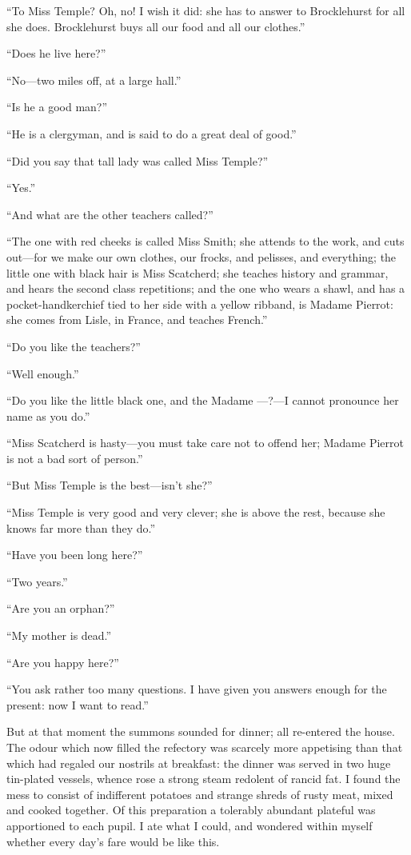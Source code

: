 \enquote{To Miss Temple? Oh, no! I wish it did: she has to answer to
	\Mr{} Brocklehurst for all she does. \Mr{} Brocklehurst buys all our food
	and all our clothes.}

\enquote{Does he live here?}

\enquote{No---two miles off, at a large hall.}

\enquote{Is he a good man?}

\enquote{He is a clergyman, and is said to do a great deal of good.}

\enquote{Did you say that tall lady was called Miss Temple?}

\enquote{Yes.}

\enquote{And what are the other teachers called?}

\enquote{The one with red cheeks is called Miss Smith; she attends to
	the work, and cuts out---for we make our own clothes, our frocks, and
	pelisses, and everything; the little one with black hair is Miss
	Scatcherd; she teaches history and grammar, and hears the second class
	repetitions; and the one who wears a shawl, and has a
	pocket-handkerchief tied to her side with a yellow ribband, is Madame
	Pierrot: she comes from Lisle, in France, and teaches French.}

\enquote{Do you like the teachers?}

\enquote{Well enough.}

\enquote{Do you like the little black one, and the Madame ---?---I
	cannot pronounce her name as you do.}

\enquote{Miss Scatcherd is hasty---you must take care not to offend her;
	Madame Pierrot is not a bad sort of person.}

\enquote{But Miss Temple is the best---isn't she?}

\enquote{Miss Temple is very good and very clever; she is above the
	rest, because she knows far more than they do.}

\enquote{Have you been long here?}

\enquote{Two years.}

\enquote{Are you an orphan?}

\enquote{My mother is dead.}

\enquote{Are you happy here?}

\enquote{You ask rather too many questions. I have given you answers
	enough for the present: now I want to read.}

But at that moment the summons sounded for dinner; all re-entered the
house. The odour which now filled the refectory was scarcely more
appetising than that which had regaled our nostrils at breakfast: the
dinner was served in two huge tin-plated vessels, whence rose a strong
steam redolent of rancid fat. I found the mess to consist of
indifferent potatoes and strange shreds of rusty meat, mixed and cooked
together. Of this preparation a tolerably abundant plateful was
apportioned to each pupil. I ate what I could, and wondered within
myself whether every day's fare would be like this.

